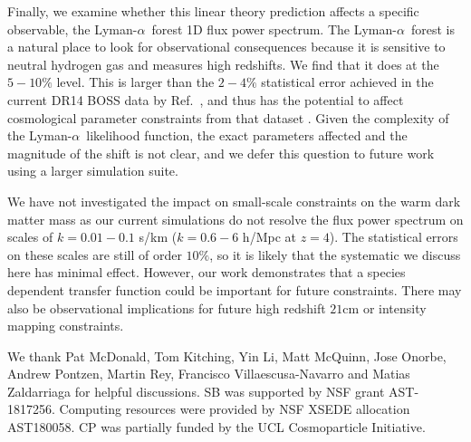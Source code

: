 \documentclass[a4paper,11pt]{article}
\newcommand{\Lya}{Lyman-$\alpha$}
\begin{document}
Finally, we examine whether this linear theory prediction affects a specific observable, the \Lya~forest 1D flux power spectrum. The \Lya~forest is a natural place to look for observational consequences because it is sensitive to neutral hydrogen gas and measures high redshifts.
We find that it does at the $5-10\%$ level. This is larger than the $2-4\%$ statistical error achieved in the current DR14 BOSS data by Ref.~\cite{Chabanier:2019}, and thus has the potential to affect cosmological parameter constraints from that dataset \cite[e.g][]{PD2019}. Given the complexity of the \Lya~likelihood function, the exact parameters affected and the magnitude of the shift is not clear, and we defer this question to future work using a larger simulation suite.

We have not investigated the impact on small-scale constraints on the warm dark matter mass \cite{Irsic:2017} as our current simulations do not resolve the flux power spectrum on scales of $k = 0.01 - 0.1$ s/km ($k = 0.6 - 6$ h/Mpc at $z = 4$). The statistical errors on these scales are still of order $10\%$, so it is likely that the systematic we discuss here has minimal effect. However, our work demonstrates that a species dependent transfer function could be important for future constraints. There may also be observational implications for future high redshift $21$cm or intensity mapping constraints.


\acknowledgments

We thank Pat McDonald, Tom Kitching, Yin Li, Matt McQuinn, Jose Onorbe, Andrew Pontzen, Martin Rey, Francisco Villaescusa-Navarro and Matias Zaldarriaga for helpful discussions. SB was supported by NSF grant AST-1817256. Computing resources were provided by NSF XSEDE allocation AST180058. CP was partially funded by the UCL Cosmoparticle Initiative.
\end{document}
